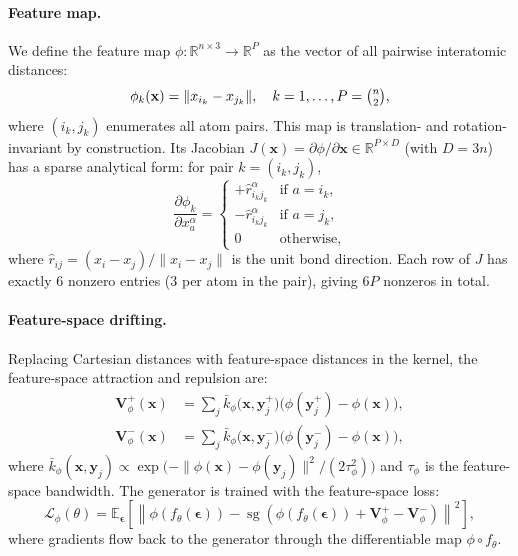 \documentclass[11pt]{article}
\newcommand{\bx}{\mathbf{x}}
\newcommand{\by}{\mathbf{y}}
\newcommand{\bV}{\mathbf{V}}
\newcommand{\beps}{\boldsymbol{\epsilon}}
\newcommand{\E}{\mathbb{E}}
\newcommand{\R}{\mathbb{R}}
\newcommand{\kbar}{\bar{k}}
\newcommand{\sg}{\operatorname{sg}}
\begin{document}
\paragraph{Feature map.}
We define the feature map $\phi\colon \R^{n \times 3} \to \R^P$ as the vector of all pairwise interatomic distances:
\begin{equation}
    \phi_k(\bx) = \|x_{i_k} - x_{j_k}\|, \quad k = 1,\ldots,P = \tbinom{n}{2},
    \label{eq:feature-map}
\end{equation}
where $(i_k, j_k)$ enumerates all atom pairs.
This map is translation- and rotation-invariant by construction.
Its Jacobian $J(\bx) = \partial\phi/\partial\bx \in \R^{P \times D}$ (with $D = 3n$) has a sparse analytical form: for pair $k = (i_k, j_k)$,
\begin{equation}
    \frac{\partial \phi_k}{\partial x_a^\alpha} = \begin{cases}
        +\hat{r}_{i_k j_k}^\alpha & \text{if } a = i_k, \\[2pt]
        -\hat{r}_{i_k j_k}^\alpha & \text{if } a = j_k, \\[2pt]
        0 & \text{otherwise},
    \end{cases}
    \label{eq:jacobian}
\end{equation}
where $\hat{r}_{ij} = (x_i - x_j)/\|x_i - x_j\|$ is the unit bond direction.
Each row of $J$ has exactly 6 nonzero entries (3 per atom in the pair), giving $6P$ nonzeros in total.

\paragraph{Feature-space drifting.}
Replacing Cartesian distances with feature-space distances in the kernel, the feature-space attraction and repulsion are:
\begin{align}
    \bV_\phi^+(\bx) &= \sum_j \kbar_\phi\!\big(\bx, \by_j^+\big)\big(\phi(\by_j^+) - \phi(\bx)\big), \label{eq:feature-attract} \\
    \bV_\phi^-(\bx) &= \sum_j \kbar_\phi\!\big(\bx, \by_j^-\big)\big(\phi(\by_j^-) - \phi(\bx)\big), \label{eq:feature-repel}
\end{align}
where $\kbar_\phi(\bx, \by_j) \propto \exp\!\big(-\|\phi(\bx) - \phi(\by_j)\|^2 / (2\tau_\phi^2)\big)$ and $\tau_\phi$ is the feature-space bandwidth.
The generator is trained with the feature-space loss:
\begin{equation}
    \mathcal{L}_\phi(\theta) = \E_{\beps}\!\left[\left\|\phi(f_\theta(\beps)) - \sg\!\left(\phi(f_\theta(\beps)) + \bV_\phi^+ - \bV_\phi^-\right)\right\|^2\right],
    \label{eq:feature-loss}
\end{equation}
where gradients flow back to the generator through the differentiable map $\phi \circ f_\theta$.
\end{document}
